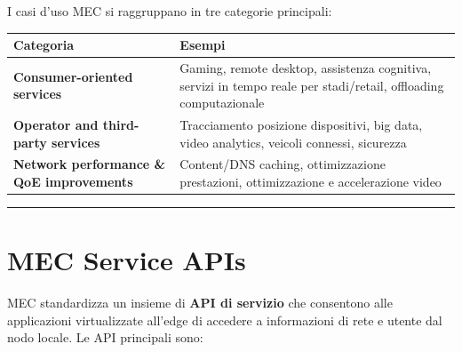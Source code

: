 \documentclass[
  italian,
  openany]{book}
\newcounter{none} %
\begin{document}
I casi d'uso MEC si raggruppano in tre categorie principali:

{\def\LTcaptype{none} %
\begin{longtable}[]{@{}
  >{\raggedright\arraybackslash}p{}
  >{\raggedright\arraybackslash}p{}@{}}
\toprule\noalign{}
\begin{minipage}[b]{\linewidth}\raggedright
Categoria
\end{minipage} & \begin{minipage}[b]{\linewidth}\raggedright
Esempi
\end{minipage} \\
\midrule\noalign{}
\endhead
\bottomrule\noalign{}
\endlastfoot
\textbf{Consumer-oriented services} & Gaming, remote desktop, assistenza
cognitiva, servizi in tempo reale per stadi/retail, offloading
computazionale \\
\textbf{Operator and third-party services} & Tracciamento posizione
dispositivi, big data, video analytics, veicoli connessi, sicurezza \\
\textbf{Network performance \& QoE improvements} & Content/DNS caching,
ottimizzazione prestazioni, ottimizzazione e accelerazione video \\
\end{longtable}
}

\begin{center}\rule{0.5\linewidth}{0.5pt}\end{center}

\section{MEC Service APIs}\label{mec-service-apis}

MEC standardizza un insieme di \textbf{API di servizio} che consentono
alle applicazioni virtualizzate all'edge di accedere a informazioni di
rete e utente dal nodo locale. Le API principali sono:
\end{document}
